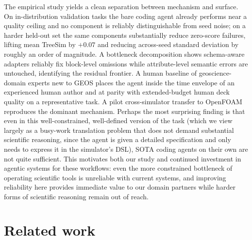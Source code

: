 \documentclass{article}
\begin{document}
The empirical study yields a clean separation between mechanism and surface. On in-distribution validation tasks the bare coding agent already performs near a quality ceiling and no component is reliably distinguishable from seed noise; on a harder held-out set the same components substantially reduce zero-score failures, lifting mean TreeSim by $+0.07$ and reducing across-seed standard deviation by roughly an order of magnitude. A bottleneck decomposition shows schema-aware adapters reliably fix block-level omissions while attribute-level semantic errors are untouched, identifying the residual frontier. A human baseline of geoscience-domain experts new to GEOS places the agent inside the time envelope of an experienced human author and at parity with extended-budget human deck quality on a representative task. A pilot cross-simulator transfer to OpenFOAM reproduces the dominant mechanism. Perhaps the most surprising finding is that even in this well-constrained, well-defined version of the task (which we view largely as a busy-work translation problem that does not demand substantial scientific reasoning, since the agent is given a detailed specification and only needs to express it in the simulator's DSL), SOTA coding agents on their own are not quite sufficient. This motivates both our study and continued investment in agentic systems for these workflows: even the more constrained bottleneck of operating scientific tools is unreliable with current systems, and improving reliability here provides immediate value to our domain partners while harder forms of scientific reasoning remain out of reach.

\section{Related work}
\label{sec:related}
\end{document}

